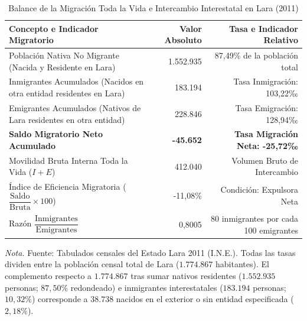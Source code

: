 \documentclass[12pt,letterpaper]{article}
\begin{document}
\begin{table}[htbp]
    \centering
    \caption{Balance de la Migración Toda la Vida e Intercambio Interestatal en Lara (2011)}
    \label{tab:migracion}
    \small
    \begin{tabularx}{\textwidth}{>{\raggedright\arraybackslash}Xrr}
        \toprule
        \textbf{Concepto e Indicador Migratorio} & \textbf{Valor Absoluto} & \textbf{Tasa e Indicador Relativo} \\
        \midrule
        Población Nativa No Migrante (Nacida y Residente en Lara) & 1.552.935 & 87,49\% de la población total \\
        Inmigrantes Acumulados (Nacidos en otra entidad residentes en Lara) & 183.194 & Tasa Inmigración: 103,22‰ \\
        Emigrantes Acumulados (Nativos de Lara residentes en otra entidad) & 228.846 & Tasa Emigración: 128,94‰ \\
        \midrule
        \textbf{Saldo Migratorio Neto Acumulado} & \textbf{-45.652} & \textbf{Tasa Migración Neta: -25,72‰} \\
        Movilidad Bruta Interna Toda la Vida ($I + E$) & 412.040 & Volumen Bruto de Intercambio \\
        Índice de Eficiencia Migratoria ($\dfrac{\text{Saldo}}{\text{Bruta}} \times 100$) & -11,08\% & Condición: Expulsora Neta \\
        Razón $\dfrac{\text{Inmigrantes}}{\text{Emigrantes}}$ & 0,8005 & 80 inmigrantes por cada 100 emigrantes \\
        \bottomrule
    \end{tabularx}
    \par\vspace{2pt}\noindent\raggedright \small \textit{Nota.} Fuente: Tabulados censales del Estado Lara 2011 (I.N.E.). Todas las tasas dividen entre la población censal total de Lara ($1.774.867$ habitantes). El complemento respecto a $1.774.867$ tras sumar nativos residentes ($1.552.935$ personas; $87{,}50\%$ redondeado) e inmigrantes interestatales ($183.194$ personas; $10{,}32\%$) corresponde a $38.738$ nacidos en el exterior o sin entidad especificada ($2{,}18\%$).
\end{table}
\end{document}
